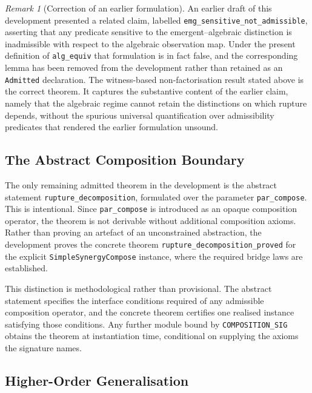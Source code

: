 \documentclass[12pt]{article}
\theoremstyle{plain}
\theoremstyle{definition}
\theoremstyle{remark}
\newtheorem{remark}[theorem]{Remark}
\begin{document}
\begin{remark}[Correction of an earlier formulation]
\label{rem:emg-correction}
An earlier draft of this development presented a related claim,
labelled \texttt{emg\_sensitive\_not\_admissible}, asserting that any
predicate sensitive to the emergent--algebraic distinction is
inadmissible with respect to the algebraic observation map.
Under the present definition of \texttt{alg\_equiv} that formulation
is in fact false, and the corresponding lemma has been removed from
the development rather than retained as an \texttt{Admitted}
declaration.
The witness-based non-factorisation result stated above is the correct
theorem.
It captures the substantive content of the earlier claim, namely that
the algebraic regime cannot retain the distinctions on which rupture
depends, without the spurious universal quantification over
admissibility predicates that rendered the earlier formulation
unsound.
\end{remark}

\subsection{The Abstract Composition Boundary}

The only remaining admitted theorem in the development is the abstract
statement \texttt{rupture\_decomposition}, formulated over the
parameter \texttt{par\_compose}.
This is intentional.
Since \texttt{par\_compose} is introduced as an opaque composition
operator, the theorem is not derivable without additional composition
axioms.
Rather than proving an artefact of an unconstrained abstraction, the
development proves the concrete theorem
\texttt{rupture\_decomposition\_proved} for the explicit
\texttt{SimpleSynergyCompose} instance, where the required bridge laws
are established.

This distinction is methodological rather than provisional.
The abstract statement specifies the interface conditions required of
any admissible composition operator, and the concrete theorem
certifies one realised instance satisfying those conditions.
Any further module bound by \texttt{COMPOSITION\_SIG} obtains the
theorem at instantiation time, conditional on supplying the axioms the
signature names.

\subsection{Higher-Order Generalisation}
\end{document}
